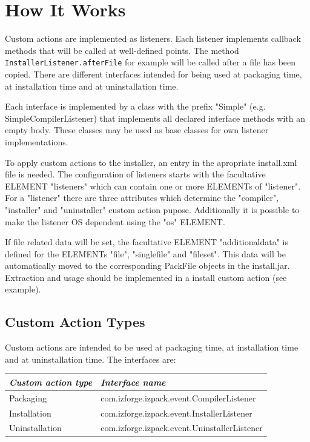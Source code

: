\section{How It Works}

Custom actions are implemented as listeners. Each listener implements
callback methods that will be called at well-defined points. The method
\texttt{InstallerListener.afterFile} for example will be called after
a file has been copied. There are different interfaces intended for being
used at packaging time, at installation time and at uninstallation time.

Each interface is implemented by a class with the prefix
"Simple" (e.g. SimpleCompilerListener) that implements all declared interface
methods with an empty body. These classes may be used as base classes
for own listener implementations.

To apply custom actions to the installer, an entry in the apropriate
install.xml file is needed. The configuration of listeners starts with
the facultative ELEMENT "listeners" which can contain one or more ELEMENTs
of "listener". For a "listener" there are three attributes which determine the
"compiler", "installer" and "uninstaller" custom action pupose.
Additionally it is possible to make the listener OS dependent using the "os"
ELEMENT.

If file related data will be set, the facultative ELEMENT
"additionaldata" is defined for the ELEMENTs "file", "singlefile"
and "fileset". This data will be automatically moved to the
corresponding PackFile objects in the install.jar. Extraction and
usage should be implemented in a install custom action (see
example).




\subsection{Custom Action Types}

Custom actions are intended to be used at packaging time, at installation time
and at uninstallation time. The interfaces are:
\begin{center}
\begin{tabular}{|l|l|}
\hline \textit{Custom action type} & \textit{Interface name} \\
\hline Packaging & com.izforge.izpack.event.CompilerListener \\
\hline
\hline Installation & com.izforge.izpack.event.InstallerListener \\
\hline
\hline Uninstallation & com.izforge.izpack.event.UninstallerListener \\
\hline
\end{tabular}\
\end{center}

